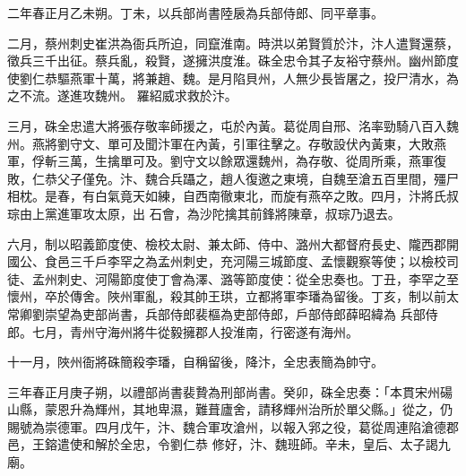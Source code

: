 \begin{pinyinscope}
 二年春正月乙未朔。丁未，以兵部尚書陸扆為兵部侍郎、同平章事。



 二月，蔡州刺史崔洪為衙兵所迫，同竄淮南。時洪以弟賢質於汴，汴人遣賢還蔡，徵兵三千出征。蔡兵亂，殺賢，遂擁洪度淮。硃全忠令其子友裕守蔡州。幽州節度使劉仁恭驅燕軍十萬，將兼趙、魏。是月陷貝州，人無少長皆屠之，投尸清水，為之不流。遂進攻魏州。
 羅紹威求救於汴。



 三月，硃全忠遣大將張存敬率師援之，屯於內黃。葛從周自邢、洺率勁騎八百入魏州。燕將劉守文、單可及聞汴軍在內黃，引軍往擊之。存敬設伏內黃東，大敗燕軍，俘斬三萬，生擒單可及。劉守文以餘眾還魏州，為存敬、從周所乘，燕軍復敗，仁恭父子僅免。汴、魏合兵躡之，趙人復邀之東境，自魏至滄五百里間，殭尸相枕。是春，有白氣竟天如練，自西南徹東北，而旋有燕卒之敗。四月，汴將氏叔琮由上黨進軍攻太原，出
 石會，為沙陀擒其前鋒將陳章，叔琮乃退去。



 六月，制以昭義節度使、檢校太尉、兼太師、侍中、潞州大都督府長史、隴西郡開國公、食邑三千戶李罕之為孟州刺史，充河陽三城節度、孟懷觀察等使；以檢校司徒、孟州刺史、河陽節度使丁會為澤、潞等節度使：從全忠奏也。丁丑，李罕之至懷州，卒於傳舍。陜州軍亂，殺其帥王珙，立都將軍李璠為留後。丁亥，制以前太常卿劉崇望為吏部尚書，兵部侍郎裴樞為吏部侍郎，戶部侍郎薛昭緯為
 兵部侍郎。七月，青州守海州將牛從毅擁郡人投淮南，行密遂有海州。



 十一月，陜州衙將硃簡殺李璠，自稱留後，降汴，全忠表簡為帥守。



 三年春正月庚子朔，以禮部尚書裴贄為刑部尚書。癸卯，硃全忠奏：「本貫宋州碭山縣，蒙恩升為輝州，其地卑濕，難葺廬舍，請移輝州治所於單父縣。」從之，仍賜號為崇德軍。四月戊午，汴、魏合軍攻滄州，以報入郛之役，葛從周連陷滄德郡邑，王鎔遣使和解於全忠，令劉仁恭
 修好，汴、魏班師。辛未，皇后、太子謁九廟。




\end{pinyinscope}

